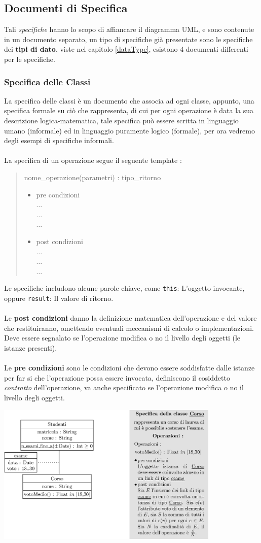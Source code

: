 \documentclass[12pt, letterpaper]{article}
\newcommand{\code}[1]{\colorbox{light-gray}{\texttt{#1}}}
\newcommand{\acc}{\\\hphantom{}\\}
\begin{document}
 \subsection{Documenti di Specifica}
Tali \textit{specifiche} hanno lo scopo di affiancare il diagramma UML, e sono contenute in un documento separato, un tipo 
di specifiche già presentate sono le specifiche dei \textbf{tipi di dato}, viste nel capitolo \ref{dataType}, esistono 
4 documenti differenti per le specifiche.
\subsubsection{Specifica delle Classi}
La specifica delle classi è un documento che associa ad ogni classe, appunto, una specifica formale su ciò che rappresenta, di cui 
per ogni operazione è data la sua descrizione logica-matematica, tale specifica può essere scritta in linguaggio 
umano (informale) ed in linguaggio puramente logico (formale), per ora vedremo degli esempi di specifiche 
informali.\acc 
La specifica di un operazione segue il seguente template : \begin{quote}
    nome\_operazione(parametri) : tipo\_ritorno\begin{itemize}
        \item pre condizioni  \\\(\dots\)\\\(\dots\)\\\(\dots\)
        \item post condizioni  \\\(\dots\)\\\(\dots\)\\\(\dots\)
    \end{itemize}
\end{quote}
Le specifiche includono alcune parole chiave, come \code{this}: L'oggetto invocante, oppure 
\code{result}: Il valore di ritorno.\acc 
Le \textbf{post condizioni} danno la definizione matematica dell'operazione e del valore che restituiranno, 
omettendo eventuali meccanismi di calcolo o implementazioni. Deve essere segnalato se l'operazione 
modifica o no il livello degli oggetti (le istanze presenti).\acc Le \textbf{pre condizioni} sono le condizioni 
che devono essere soddisfatte dalle istanze per far si che l'operazione possa essere 
invocata, definiscono il cosiddetto \textit{contratto} dell'operazione, va anche specificato se l'operazione 
modifica o no il livello degli oggetti.\begin{center}
    \includegraphics[width=0.8\textwidth ]{images/specificaClassi.eps}
\end{center}
\end{document}
